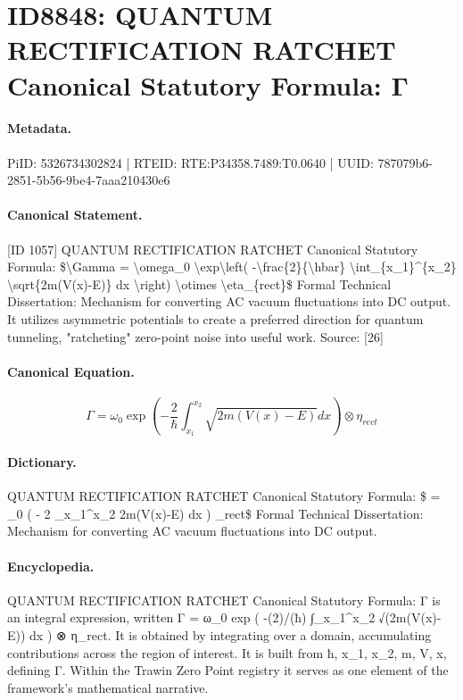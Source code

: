 \section*{ID8848: QUANTUM RECTIFICATION RATCHET Canonical Statutory Formula: Γ}
\paragraph{Metadata.}
PiID: 5326734302824 | RTEID: RTE:P34358.7489:T0.0640 | UUID: 787079b6-2851-5b56-9be4-7aaa210430e6

\paragraph{Canonical Statement.}
[ID 1057] QUANTUM RECTIFICATION RATCHET Canonical Statutory Formula: \$\textbackslash{}Gamma = \textbackslash{}omega\_0 \textbackslash{}exp\textbackslash{}left( -\textbackslash{}frac\{2\}\{\textbackslash{}hbar\} \textbackslash{}int\_\{x\_1\}\textasciicircum{}\{x\_2\} \textbackslash{}sqrt\{2m(V(x)-E)\} dx \textbackslash{}right) \textbackslash{}otimes \textbackslash{}eta\_\{rect\}\$ Formal Technical Dissertation: Mechanism for converting AC vacuum fluctuations into DC output. It utilizes asymmetric potentials to create a preferred direction for quantum tunneling, "ratcheting" zero-point noise into useful work. Source: [26]

\paragraph{Canonical Equation.}
\[
\Gamma = \omega_0 \exp\left( -\frac{2}{\hbar} \int_{x_1}^{x_2} \sqrt{2m(V(x)-E)} dx \right) \otimes \eta_{rect}
\]

\paragraph{Dictionary.}
QUANTUM RECTIFICATION RATCHET Canonical Statutory Formula: \$ = \_0 ( - 2 \_x\_1\textasciicircum{}x\_2 2m(V(x)-E) dx ) \_rect\$ Formal Technical Dissertation: Mechanism for converting AC vacuum fluctuations into DC output.

\paragraph{Encyclopedia.}
QUANTUM RECTIFICATION RATCHET Canonical Statutory Formula: Γ is an integral expression, written Γ = ω\_0 exp ( -(2)/(ħ) ∫\_x\_1\textasciicircum{}x\_2 √(2m(V(x)-E)) dx ) ⊗ η\_rect. It is obtained by integrating over a domain, accumulating contributions across the region of interest. It is built from ħ, x\_1, x\_2, m, V, x, defining Γ. Within the Trawin Zero Point registry it serves as one element of the framework's mathematical narrative.
